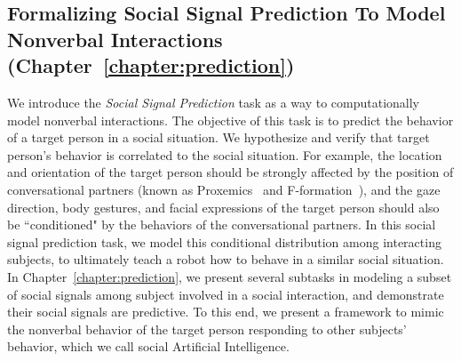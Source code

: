 \subsection{Formalizing Social Signal Prediction To Model Nonverbal Interactions  (Chapter~\ref{chapter:prediction})}

We introduce the \emph{Social Signal Prediction} task as a way to computationally model nonverbal interactions. The objective of this task is to predict the behavior of a target person in a social situation. We hypothesize and verify that target person's behavior is correlated to the social situation. For example, the location and orientation of the target person should be strongly affected by the position of conversational partners (known as Proxemics~\cite{Hall66} and F-formation~\cite{kendon90}), and the gaze direction, body gestures, and facial expressions of the target person should also be ``conditioned" by the behaviors of the conversational partners. In this social signal prediction task, we model this conditional distribution among interacting subjects, to ultimately teach a robot how to behave in a similar social situation. In Chapter~\ref{chapter:prediction}, we present several subtasks in modeling a subset of social signals among subject involved in a social interaction, and demonstrate their social signals are predictive. To this end, we present a framework to mimic the nonverbal behavior of the target person responding to other subjects' behavior, which we call social Artificial Intelligence. 




